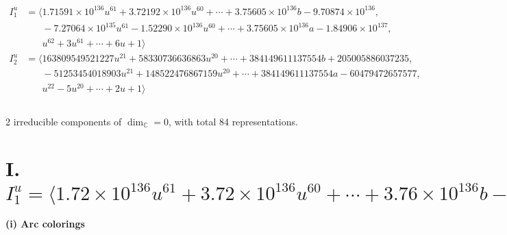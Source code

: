 \documentclass[1p]{elsarticle_modified}
\theoremstyle{definition}
\begin{document}
\begin{align*}
I^u_{1}&=\langle 
1.71591\times10^{136} u^{61}+3.72192\times10^{136} u^{60}+\cdots+3.75605\times10^{136} b-9.70874\times10^{136},\\
\phantom{I^u_{1}}&\phantom{= \langle  }-7.27064\times10^{135} u^{61}-1.52290\times10^{136} u^{60}+\cdots+3.75605\times10^{136} a-1.84906\times10^{137},\\
\phantom{I^u_{1}}&\phantom{= \langle  }u^{62}+3 u^{61}+\cdots+6 u+1\rangle \\
I^u_{2}&=\langle 
163809549521227 u^{21}+58330736636863 u^{20}+\cdots+384149611137554 b+205005886037235,\\
\phantom{I^u_{2}}&\phantom{= \langle  }-51253454018903 u^{21}+148522476867159 u^{20}+\cdots+384149611137554 a-60479472657577,\\
\phantom{I^u_{2}}&\phantom{= \langle  }u^{22}-5 u^{20}+\cdots+2 u+1\rangle \\
\\
\end{align*}
\raggedright * 2 irreducible components of $\dim_{\mathbb{C}}=0$, with total 84 representations.\\
\newpage
\renewcommand{\arraystretch}{1}
\centering \section*{I. $I^u_{1}= \langle 1.72\times10^{136} u^{61}+3.72\times10^{136} u^{60}+\cdots+3.76\times10^{136} b-9.71\times10^{136},\;-7.27\times10^{135} u^{61}-1.52\times10^{136} u^{60}+\cdots+3.76\times10^{136} a-1.85\times10^{137},\;u^{62}+3 u^{61}+\cdots+6 u+1 \rangle$}
\flushleft \textbf{(i) Arc colorings}\\
\end{document}
